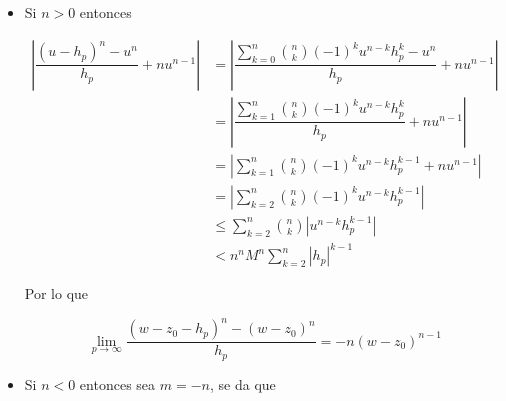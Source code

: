 \documentclass[12pt, fleqn]{article}
\begin{document}
	\begin{itemize}
		\item Si $ n > 0 $ entonces
		
		\begin{align*}
			\left\lvert \dfrac{(u - h_p)^n - u^n}{h_p} + nu^{n-1} \right\rvert &= \left\lvert \dfrac{\sum_{k=0}^{n} \binom{n}{k} (-1)^k u^{n-k} h_p^k - u^n}{h_p} + nu^{n-1} \right\rvert \\
			&= \left\lvert \dfrac{\sum_{k=1}^{n} \binom{n}{k} (-1)^k u^{n-k} h_p^k}{h_p} + nu^{n-1} \right\rvert \\
			&= \left\lvert \sum_{k=1}^{n} \binom{n}{k} (-1)^k u^{n-k} h_p^{k-1} + nu^{n-1} \right\rvert \\
			&= \left\lvert \sum_{k=2}^{n} \binom{n}{k} (-1)^k u^{n-k} h_p^{k-1} \right\rvert \\
			&\leq \sum_{k=2}^{n} \binom{n}{k} \left\lvert u^{n-k} h_p^{k-1} \right\rvert \\
			&< n^n M^n \sum_{k=2}^{n} \left\lvert h_p \right\rvert^{k-1}
		\end{align*}

		Por lo que

		\begin{equation*}
			\lim_{p \to \infty} \dfrac{(w - z_0 - h_p)^n - (w - z_0)^n}{h_p} = -n(w - z_0)^{n-1}
		\end{equation*}

		\item Si $ n < 0 $ entonces sea $ m = -n $, se da que
		

\end{itemize}
\end{document}
